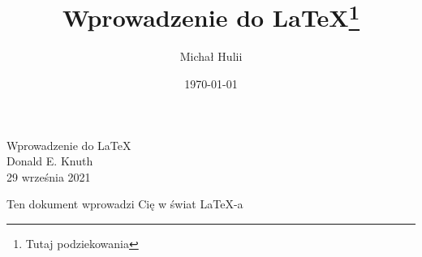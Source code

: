 \documentclass{article}
\author{Michał Hulii}
\title{Wprowadzenie do \LaTeX \thanks{Tutaj podziekowania}}
\date{\today}
\begin{document}
	\begin{center}
		Wprowadzenie do \LaTeX * \\
		Donald E. Knuth \\
		29 września 2021
	\end{center}
	Ten dokument wprowadzi Cię w świat \LaTeX -a
\end{document}
